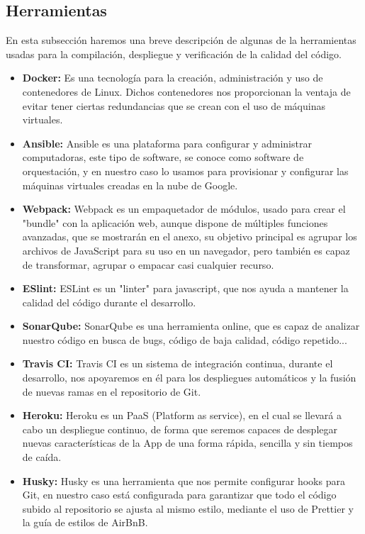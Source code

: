\subsection {Herramientas}
En esta subsección haremos una breve descripción de algunas de la herramientas usadas para la compilación, despliegue y verificación de la calidad del código.
\begin{itemize}
  \item \textbf{Docker:} Es una tecnología para la creación, administración y uso de contenedores de Linux. Dichos contenedores nos proporcionan la ventaja de evitar tener ciertas redundancias que se crean con el uso de máquinas virtuales.
  \item \textbf{Ansible:} Ansible es una plataforma para configurar y administrar computadoras, este tipo de software, se conoce como software de orquestación, y en nuestro caso lo usamos para provisionar y configurar las máquinas virtuales creadas en la nube de Google.
  \item \textbf{Webpack:} Webpack es un empaquetador de módulos, usado para crear el "bundle" con la aplicación web, aunque dispone de múltiples funciones avanzadas, que se mostrarán en el anexo, su objetivo principal es agrupar los archivos de JavaScript para su uso en un navegador, pero también es capaz de transformar, agrupar o empacar casi cualquier recurso.
  \item \textbf{ESlint:} ESLint es un "linter" para javascript, que nos ayuda a mantener la calidad del código durante el desarrollo.
  \item \textbf{SonarQube:} SonarQube es una herramienta online, que es capaz de analizar nuestro código en busca de bugs, código de baja calidad, código repetido...
  \item \textbf{Travis CI:} Travis CI es un sistema de integración continua, durante el desarrollo, nos apoyaremos en él para los despliegues automáticos y la fusión de nuevas ramas en el repositorio de Git.
  \item \textbf{Heroku:} Heroku es un PaaS (Platform as service), en el cual se llevará a cabo un despliegue continuo, de forma que seremos capaces de desplegar nuevas características de la App de una forma rápida, sencilla y sin tiempos de caída.
  \item \textbf{Husky:} Husky es una herramienta que nos permite configurar hooks para Git, en nuestro caso está configurada para garantizar que todo el código subido al repositorio se ajusta al mismo estilo, mediante el uso de Prettier y la guía de estilos de AirBnB.

\end{itemize}
